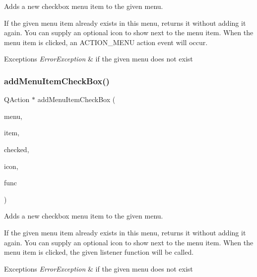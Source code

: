Adds a new checkbox menu item to the given menu. 

If the given menu item already exists in this menu, returns it without adding it again. You can supply an optional icon to show next to the menu item. When the menu item is clicked, an A\+C\+T\+I\+O\+N\+\_\+\+M\+E\+NU action event will occur. 
\begin{DoxyExceptions}{Exceptions}
{\em Error\+Exception} & if the given menu does not exist \\
\hline
\end{DoxyExceptions}
\mbox{\label{classGWindow_aab18d66dc7ed71468da3611b28450995}} 
\subsubsection{\texorpdfstring{add\+Menu\+Item\+Check\+Box()}{addMenuItemCheckBox()}\hspace{0.1cm}{\footnotesize\ttfamily [2/2]}}
{\footnotesize\ttfamily Q\+Action $\ast$ add\+Menu\+Item\+Check\+Box (\begin{DoxyParamCaption}\item[{const std\+::string \&}]{menu,  }\item[{const std\+::string \&}]{item,  }\item[{bool}]{checked,  }\item[{const std\+::string \&}]{icon,  }\item[{G\+Event\+Listener\+Void}]{func }\end{DoxyParamCaption})\hspace{0.3cm}{\ttfamily [virtual]}}



Adds a new checkbox menu item to the given menu. 

If the given menu item already exists in this menu, returns it without adding it again. You can supply an optional icon to show next to the menu item. When the menu item is clicked, the given listener function will be called. 
\begin{DoxyExceptions}{Exceptions}
{\em Error\+Exception} & if the given menu does not exist \\
\hline
\end{DoxyExceptions}
\mbox{\label{classGWindow_abdf4f167a7135e31ecb8f3363fddfd19}} 
